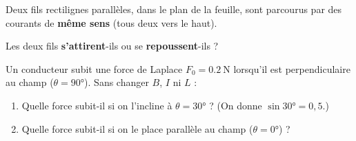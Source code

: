 \documentclass[11pt,a4paper]{article}
\begin{document}
\begin{exo}
Deux fils rectilignes parallèles, dans le plan de la feuille, sont parcourus par des courants de
\textbf{même sens} (tous deux vers le haut).
\begin{center}
\end{center}
Les deux fils \textbf{s'attirent}-ils ou se \textbf{repoussent}-ils ?
\end{exo}

\begin{exo}
Un conducteur subit une force de Laplace $F_0=\qty{0.2}{\newton}$ lorsqu'il est perpendiculaire au
champ ($\theta=\ang{90}$). Sans changer $B$, $I$ ni $L$ :
\begin{enumerate}[label=\alph*)]
  \item Quelle force subit-il si on l'incline à $\theta=\ang{30}$ ? (On donne $\sin\ang{30}=0{,}5$.)
  \item Quelle force subit-il si on le place parallèle au champ ($\theta=\ang{0}$) ?
\end{enumerate}
\end{exo}
\end{document}
